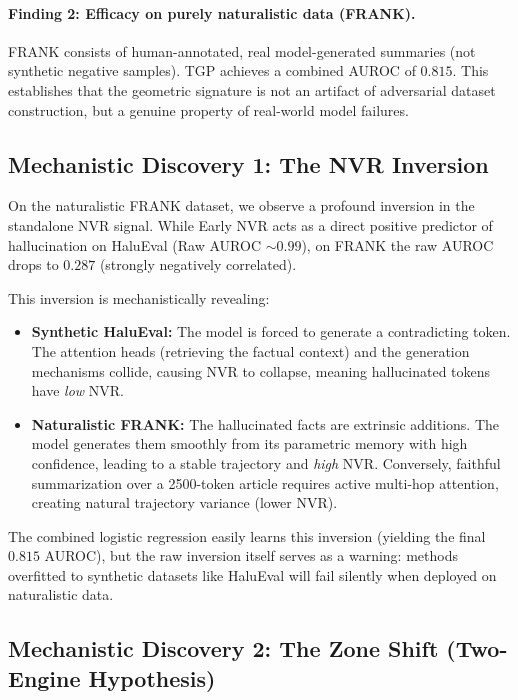 \documentclass[10pt]{article}
\newcommand{\tgp}{\textsc{TGP}\xspace}
\begin{document}
\paragraph{Finding 2: Efficacy on purely naturalistic data (FRANK).}
FRANK consists of human-annotated, real model-generated summaries (not synthetic negative samples). \tgp achieves a combined AUROC of $0.815$. This establishes that the geometric signature is not an artifact of adversarial dataset construction, but a genuine property of real-world model failures.

\subsection{Mechanistic Discovery 1: The NVR Inversion}
\label{sec:nvr-inversion}

On the naturalistic FRANK dataset, we observe a profound inversion in the standalone NVR signal. While Early NVR acts as a direct positive predictor of hallucination on HaluEval (Raw AUROC ${\sim}0.99$), on FRANK the raw AUROC drops to $0.287$ (strongly negatively correlated). 

This inversion is mechanistically revealing:
\begin{itemize}[nosep,leftmargin=*]
    \item \textbf{Synthetic HaluEval:} The model is forced to generate a contradicting token. The attention heads (retrieving the factual context) and the generation mechanisms collide, causing NVR to collapse, meaning hallucinated tokens have \emph{low} NVR.
    \item \textbf{Naturalistic FRANK:} The hallucinated facts are extrinsic additions. The model generates them smoothly from its parametric memory with high confidence, leading to a stable trajectory and \emph{high} NVR. Conversely, faithful summarization over a 2500-token article requires active multi-hop attention, creating natural trajectory variance (lower NVR).
\end{itemize}
The combined logistic regression easily learns this inversion (yielding the final $0.815$ AUROC), but the raw inversion itself serves as a warning: methods overfitted to synthetic datasets like HaluEval will fail silently when deployed on naturalistic data.

\subsection{Mechanistic Discovery 2: The Zone Shift (Two-Engine Hypothesis)}
\label{sec:zone-shift}
\end{document}
